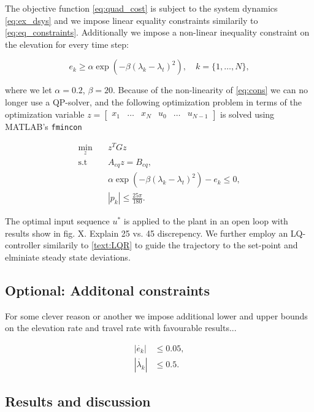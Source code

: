 The objective function \eqref{eq:quad_cost} is subject to the system dynamics \eqref{eq:ex_dsys} and we impose linear equality constraints similarily to \eqref{eq:eq_constraints}. Additionally we impose a non-linear inequality constraint on the elevation for every time step:

\begin{equation}
	\label{eq:cons}
	e_k \ge \alpha \exp{\left(-\beta\left(\lambda_k - \lambda_t\right)^2\right)}, \quad k = \{1, \dots , N\},
\end{equation}

where we let $\alpha = 0.2$, $\beta = 20$. Because of the non-linearity of \eqref{eq:cons} we can no longer use a QP-solver, and the following optimization problem in terms of the optimization variable $z = \begin{bmatrix} x_1 & \dots & x_N & u_0 & \dots & u_{N-1} \end{bmatrix}$ is solved using MATLAB's \texttt{fmincon}

\begin{align*}
	\min_z \quad &z^T G z \\
	\textrm{s.t}\quad &A_{eq} z = B_{eq}, \\
				  &\alpha \exp{\left(-\beta\left(\lambda_k - \lambda_t\right)^2\right)} - e_k \le 0,\\
				  &|p_k| \le \frac{25 \pi}{180}.
\end{align*}

The optimal input sequence $u^*$ is applied to the plant in an open loop with results show in fig. X. Explain 25 vs. 45 discrepency. We further employ an LQ-controller similarily to \ref{text:LQR} to guide the trajectory to the set-point and elminiate steady state deviations.

\subsection{Optional: Additonal constraints}
For some clever reason or another we impose additional lower and upper bounds on the elevation rate and travel rate with favourable results...

\begin{align*}
	|\dot{e_k}| &\le 0.05, \\
	|\dot{\lambda_k}| &\le 0.5.
\end{align*}
\subsection{Results and discussion}



